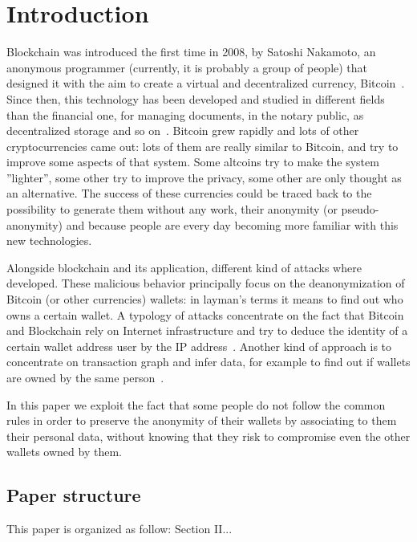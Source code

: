 \section{Introduction}
Blockchain was introduced the first time in 2008, by Satoshi Nakamoto, an
anonymous programmer (currently, it is probably a group of people) that
designed it with the aim to create a virtual and decentralized currency,
Bitcoin~\cite{satoshi}. Since then, this technology has been developed and
studied in different fields than the financial one, for managing documents, in
the notary public, as decentralized storage and so on~\cite{air}. Bitcoin grew
rapidly and lots of other cryptocurrencies came out: lots of them are really
similar to Bitcoin, and try to improve some aspects of that system. Some
altcoins try to make the system ''lighter'', some other try to improve the
privacy, some other are only thought as an alternative. The success of these
currencies could be traced back to the possibility to generate them without any 
work,
their anonymity (or pseudo-anonymity) and because people are every day becoming
more familiar with this new technologies.

Alongside blockchain and its application, different kind of attacks where
developed. These malicious behavior principally focus on the deanonymization of
Bitcoin (or other currencies) wallets: in layman's terms it means to find out
who owns a certain wallet. A typology of attacks concentrate on the fact that
Bitcoin and Blockchain rely on Internet infrastructure and try to deduce the
identity of a certain wallet address user by the IP address~\cite{deanon}.
Another kind of approach is to concentrate on transaction graph and infer data,
for example to find out if wallets are owned by the same person~\cite{fistful}.

In this paper we exploit the fact that some people do not follow the common
rules in order to preserve the anonymity of their wallets by associating to them
their personal data, without knowing that they risk to compromise even the other
wallets owned by them.


\subsection{Paper structure}
This paper is organized as follow: Section II...